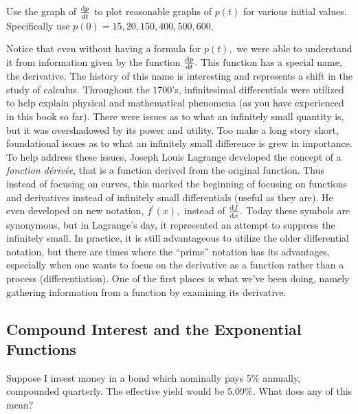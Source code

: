 \begin{embeddedproblem}
  Use the graph of $\frac{\text{d}{p}}{\text{d}{t}}$ to plot
  reasonable graphs of $p(t)$ for various initial values.  Specifically
  use $p(0)=15, 20, 150, 400, 500, 600.$ 


  Notice that even without having a formula for $p(t),$ we were able
  to understand it from information given by the function
  $\frac{\text{d}{p}}{\text{d}{t}}.$ This function has a special name, the derivative. The
  history of this name is interesting and represents a shift in the
  study of calculus.  Throughout the 1700’s, infinitesimal
  differentials were utilized to help explain physical and
  mathematical phenomena (as you have experienced in this book so
  far).  There were issues as to what an infinitely small quantity is,
  but it was overshadowed by its power and utility.  Too make a long
  story short, foundational issues as to what an infinitely small
  difference is grew in importance.  To help address these issues,
  Joseph Louis Lagrange developed the concept of a {\it fonction d\'eriv\'e{}e},
  that is a function derived from the original function.  Thus instead
  of focusing on curves, this marked the beginning of focusing on
  functions and derivatives instead of infinitely small differentials
  (useful as they are).  He even developed an new notation, $f^\prime(x),$
  instead of $\frac{\text{d}{f}}{\text{d}{x}}.$  Today these symbols are synonymous, but
  in Lagrange's day, it represented an attempt to suppress the
  infinitely small.  In practice, it is still advantageous to utilize
  the older differential notation, but there are times where the
  “prime” notation has its advantages, especially when one wants to
  focus on the derivative as a function rather than a process
  (differentiation).  One of the first places is what we’ve been
  doing, namely gathering information from a function by examining its
  derivative.

\end{embeddedproblem}

\subsection{Compound Interest and the Exponential Functions}
Suppose I invest money in a bond which nominally pays 5\% annually,
compounded quarterly.  The effective yield would be 5.09\%.  What does
any of this mean?

